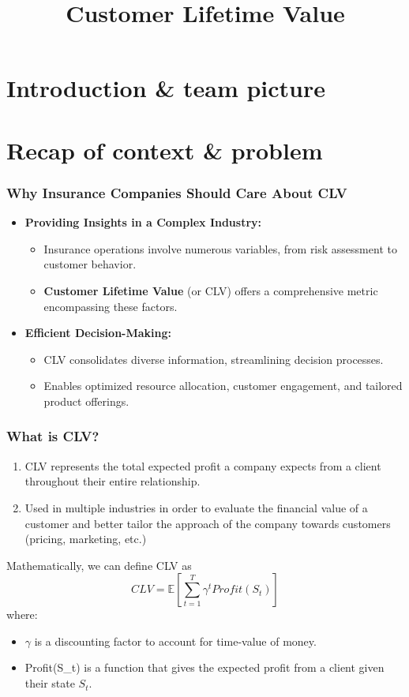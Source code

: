 \documentclass[aspectratio=169,xcolor=x11names,compress]{beamer}
\title{Customer Lifetime Value}
\author{}
\institute{}
\date{}
\newcommand{\E}{\mathbb{E}}
\begin{document}
\maketitle

\section{Introduction \& team picture}

\section{Recap of context \& problem}

\begin{frame}
\frametitle{Why Insurance Companies Should Care About CLV}

\begin{itemize}
  \item \textbf{Providing Insights in a Complex Industry:}
  \begin{itemize}
    \item Insurance operations involve numerous variables, from risk assessment to customer behavior.
    \item \textbf{Customer Lifetime Value} (or CLV) offers a comprehensive metric encompassing these factors.
  \end{itemize}
  
  \item \textbf{Efficient Decision-Making:}
  \begin{itemize}
    \item CLV consolidates diverse information, streamlining decision processes.
    \item Enables optimized resource allocation, customer engagement, and tailored product offerings.
  \end{itemize}
\end{itemize}

\end{frame}


\begin{frame}
\frametitle{What is CLV?}

\begin{enumerate}
    \item CLV represents the total expected profit a
    company expects from a client throughout their entire relationship. \pause
    \item Used in multiple industries in order to evaluate the financial value of a
    customer and better tailor the approach of the company towards
    customers (pricing, marketing, etc.) 
\end{enumerate}

Mathematically, we can define CLV as
\[
CLV = \E[\sum_{t=1}^T \gamma^t Profit(S_t)]
\]
where:
\begin{itemize}
    \item $\gamma$ is a discounting factor to account for time-value of money.
    \item Profit(S_t) is a function that gives the expected profit from a client given their state $S_t$.
\end{itemize}

\end{frame}
\end{document}
